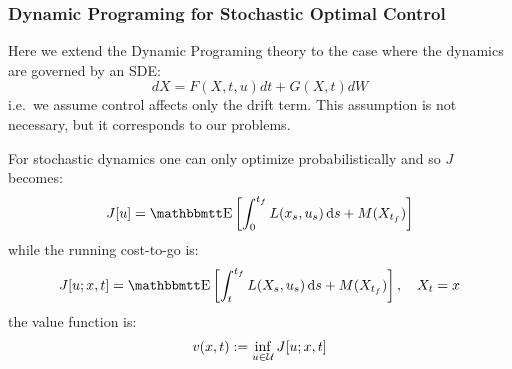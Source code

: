 \subsubsection{Dynamic Programing for Stochastic Optimal Control}
\label{sec:stochastic_control}
Here we extend the Dynamic Programing theory to the case where the dynamics are
governed by an SDE:
\begin{equation}
dX = F(X,t, u) dt + G(X,t) dW
\end{equation} 
i.e.\ we assume control affects only the drift term. This 
assumption is not necessary, but it corresponds to our problems.

For stochastic dynamics one can only optimize probabilistically and so
$J$ becomes:
\begin{equation}
J[u] = \Exp \left[ \int_0^\tf L(x_s, u_s) \intd{s} + M(X_\tf)
\right] 
\label{eq:generic_objective_function_stochastic}
\end{equation}
while the running cost-to-go is:
\begin{equation}
J[u; x, t] = \Exp \left[ \int_t^\tf L(X_s, u_s) \intd{s} + M(X_\tf) \right], 
\quad X_t = x
\label{eq:generic_cost_to_go_stochastic}
\end{equation}
the value function is:
\begin{equation}
v(x,t) := \inf_{u \in { \mathcal{U} }} J[u; x,t]
\end{equation}

